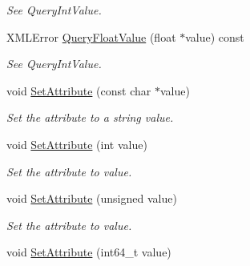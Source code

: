 \begin{DoxyCompactItemize}
\begin{DoxyCompactList}\small\item\em See Query\+Int\+Value. \end{DoxyCompactList}\item 
\mbox{\label{classtinyxml2_1_1XMLAttribute_a049dea6449a6259b6cfed44a9427b607}} 
X\+M\+L\+Error \mbox{\hyperlink{classtinyxml2_1_1XMLAttribute_a049dea6449a6259b6cfed44a9427b607}{Query\+Float\+Value}} (float $\ast$value) const
\begin{DoxyCompactList}\small\item\em See Query\+Int\+Value. \end{DoxyCompactList}\item 
\mbox{\label{classtinyxml2_1_1XMLAttribute_a406d2c4a13c7af99a65edb59dd9f7581}} 
void \mbox{\hyperlink{classtinyxml2_1_1XMLAttribute_a406d2c4a13c7af99a65edb59dd9f7581}{Set\+Attribute}} (const char $\ast$value)
\begin{DoxyCompactList}\small\item\em Set the attribute to a string value. \end{DoxyCompactList}\item 
\mbox{\label{classtinyxml2_1_1XMLAttribute_ad86d7d7058d76761c3a80662566a57e5}} 
void \mbox{\hyperlink{classtinyxml2_1_1XMLAttribute_ad86d7d7058d76761c3a80662566a57e5}{Set\+Attribute}} (int value)
\begin{DoxyCompactList}\small\item\em Set the attribute to value. \end{DoxyCompactList}\item 
\mbox{\label{classtinyxml2_1_1XMLAttribute_ae70468c0f6df2748ba3529c716999fae}} 
void \mbox{\hyperlink{classtinyxml2_1_1XMLAttribute_ae70468c0f6df2748ba3529c716999fae}{Set\+Attribute}} (unsigned value)
\begin{DoxyCompactList}\small\item\em Set the attribute to value. \end{DoxyCompactList}\item 
\mbox{\label{classtinyxml2_1_1XMLAttribute_a7c1240f479722b9aa29b6c030aa116c2}} 
void \mbox{\hyperlink{classtinyxml2_1_1XMLAttribute_a7c1240f479722b9aa29b6c030aa116c2}{Set\+Attribute}} (int64\+\_\+t value)

\end{DoxyCompactItemize}
